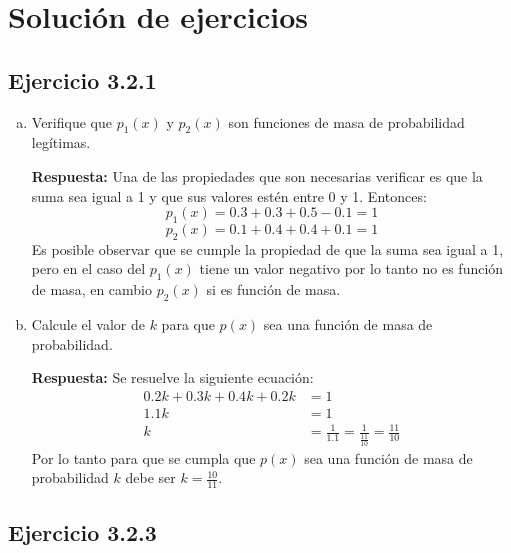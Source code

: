 \documentclass{article}\usepackage[]{graphicx}\usepackage[]{color}
\begin{document}
\section{Solución de ejercicios}

\subsection{Ejercicio 3.2.1}
\begin{enumerate}[a)]
    \item Verifique que $p_{1}(x)$ y $p_{2}(x)$ son funciones de masa de probabilidad legítimas.

\textbf{Respuesta:} Una de las propiedades que son necesarias verificar es que la suma sea igual a 1 y que sus valores estén entre 0 y 1. Entonces:
\[p_{1}(x) = 0.3+0.3+0.5-0.1 = 1\]
\[p_{2}(x) = 0.1+0.4+0.4+0.1 = 1\]
Es posible observar que se cumple la propiedad de que la suma sea igual a 1, pero en el caso del $p_{1}(x)$ tiene un valor negativo por lo tanto no es función de masa, en cambio $p_{2}(x)$ si es función de masa.

    \item Calcule el valor de $k$ para que $p(x)$ sea una función de masa de probabilidad.

\textbf{Respuesta:} Se resuelve la siguiente ecuación:
\begin{align*}
    0.2k+0.3k+0.4k+0.2k &= 1\\
    1.1k &= 1\\
    k &= \frac{1}{1.1} = \frac{1}{\frac{11}{10}} = \frac{11}{10}
\end{align*}
Por lo tanto para que se cumpla que $p(x)$ sea una función de masa de probabilidad $k$ debe ser $k = \frac{10}{11}$.
\end{enumerate}


\subsection{Ejercicio 3.2.3}
\end{document}
